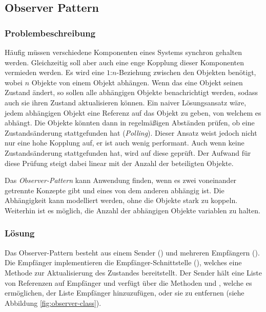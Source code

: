 \subsection{Observer Pattern}


\subsubsection*{Problembeschreibung}

Häufig müssen verschiedene Komponenten eines Systems synchron gehalten werden. Gleichzeitig soll aber auch eine enge Kopplung dieser Komponenten vermieden werden. Es wird eine $1$:$n$-Beziehung zwischen den Objekten benötigt, wobei $n$ Objekte von einem Objekt abhängen. Wenn das eine Objekt seinen Zustand ändert, so sollen alle abhängigen Objekte benachrichtigt werden, sodass auch sie ihren Zustand aktualisieren können. Ein naiver Lösungsansatz wäre, jedem abhängigen Objekt eine Referenz auf das Objekt zu geben, von welchem es abhängt. Die Objekte könnten dann in regelmäßigen Abständen prüfen, ob eine Zustandsänderung stattgefunden hat (\emph{Polling}). Dieser Ansatz weist jedoch nicht nur eine hohe Kopplung auf, er ist auch wenig performant. Auch wenn keine Zustandsänderung stattgefunden hat, wird auf diese geprüft. Der Aufwand für diese Prüfung steigt dabei linear mit der Anzahl der beteiligten Objekte.

Das \emph{Observer-Pattern} kann Anwendung finden, wenn es zwei voneinander getrennte Konzepte gibt und eines von dem anderen abhängig ist. Die Abhängigkeit kann modelliert werden, ohne die Objekte stark zu koppeln. Weiterhin ist es möglich, die Anzahl der abhängigen Objekte variablen zu halten. \cite{gamma_design_1995}

\subsubsection*{Lösung}

Das Observer-Pattern besteht aus einem Sender () und mehreren Empfängern (). Die Empfänger implementieren die Empfänger-Schnittstelle (), welches eine Methode  zur Aktualisierung des Zustandes bereitstellt. Der Sender hält eine Liste von Referenzen auf Empfänger und verfügt über die Methoden  und , welche es ermöglichen, der Liste Empfänger hinzuzufügen, oder sie zu entfernen (siehe Abbildung \ref{fig:observer-class}).

